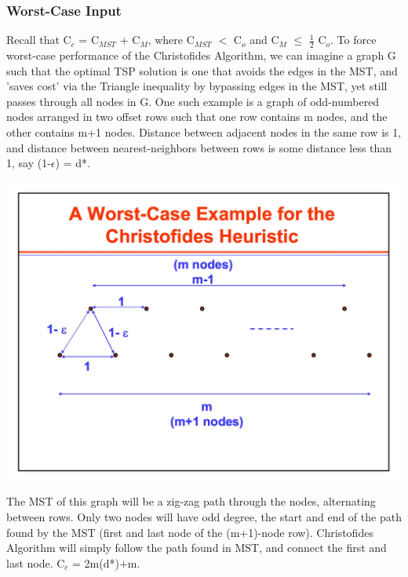 \documentclass[12pt, oneside]{article}   	%
\begin{document}
\subsubsection{Worst-Case Input}
\indent\indent Recall that C$_c$ = C$_{MST}$ + C$_M$, where C$_{MST}$ $<$ C$_o$ and C$_M$ $\leq$ $\frac{1}{2}$ C$_o$.  To force worst-case performance of the Christofides Algorithm, we can imagine a graph G such that the optimal TSP solution is one that avoids the edges in the MST, and 'saves cost' via the Triangle inequality by bypassing edges in the MST, yet still passes through all nodes in G.  One such example is a graph of odd-numbered nodes arranged in two offset rows such that one row contains m nodes, and the other contains m+1 nodes.  Distance between adjacent nodes in the same row is 1, and distance between nearest-neighbors between rows is some distance less than 1, say (1-$\epsilon$) = d*.\\
\begin{center}
\includegraphics[scale=0.2]{worst1}
\end{center}
The MST of this graph will be a zig-zag path through the nodes, alternating between rows.  Only two nodes will have odd degree, the start and end of the path found by the MST (first and last node of the (m+1)-node row).  Christofides Algorithm will simply follow the path found in MST, and connect the first and last node. C$_c$ = 2m(d*)+m.\\
\end{document}
